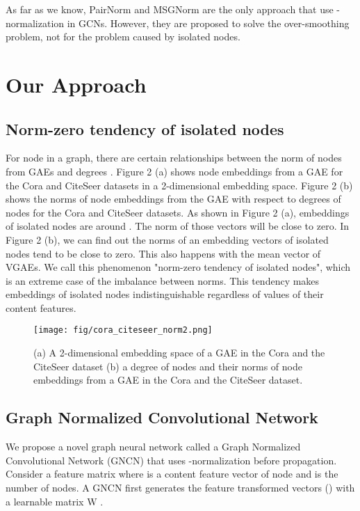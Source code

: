 \documentclass[sigconf]{acmart}
\begin{document}
As far as we know, PairNorm \cite{zhao2019pairnorm} and MSGNorm \cite{li2020deepergcn} are the only approach that use -normalization in GCNs.
However, they are proposed to solve the over-smoothing problem, not for the problem caused by isolated nodes.

\section{Our Approach}
\subsection{Norm-zero tendency of isolated nodes}
For node  in a graph, there are certain relationships between the norm of nodes  from GAEs and degrees .
Figure 2 (a) shows node embeddings from a GAE for the Cora and CiteSeer datasets in a 2-dimensional embedding space.
Figure 2 (b) shows the norms of node embeddings  from the GAE with respect to degrees of nodes for the Cora and CiteSeer datasets.
As shown in Figure 2 (a), embeddings of isolated nodes are around .
The norm of those vectors will be close to zero.
In Figure 2 (b), we can find out the norms of an embedding vectors of isolated nodes tend to be close to zero.
This also happens with the mean vector of VGAEs.
We call this phenomenon "norm-zero tendency of isolated nodes", which is an extreme case of the imbalance between norms.
This tendency makes embeddings of isolated nodes indistinguishable regardless of values of their content features.

\begin{figure}[h]
    \centering
    \texttt{[image: fig/cora\_citeseer\_norm2.png]}
    \caption{(a) A 2-dimensional embedding space of a GAE in the Cora and the CiteSeer dataset (b) a degree of nodes  and their norms of node embeddings  from a GAE in the Cora and the CiteSeer dataset.}
    \label{fig:cluster}
\end{figure}





\subsection{Graph Normalized Convolutional Network}

We propose a novel graph neural network called a Graph Normalized Convolutional Network (GNCN) that uses -normalization before propagation.
Consider a feature matrix  where  is a content feature vector of node  and  is the number of nodes.  
A GNCN first generates the feature transformed vectors () with a learnable matrix W .
\end{document}
